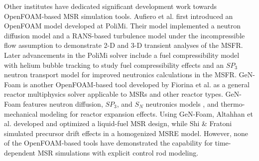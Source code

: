 Other institutes have dedicated significant development work towards
OpenFOAM-based \gls{MSR} simulation tools. Aufiero et al.
\cite{aufiero_development_2014} first introduced an OpenFOAM model developed
at \gls{PoliMi}. Their model implemented a neutron diffusion model and a
\gls{RANS}-based turbulence model under the incompressible flow assumption to demonstrate 2-D
and 3-D transient analyses of the \gls{MSFR}. Later advancements in the
\gls{PoliMi} solver include a fuel compressibility model with helium bubble
tracking to study fuel compressibility effects
\cite{cervi_development_2019} and an $SP_3$ neutron transport
model for improved neutronics calculations \cite{cervi_development_2019-1} in
the \gls{MSFR}. GeN-Foam is another OpenFOAM-based tool developed by Fiorina
et al. \cite{fiorina_gen-foam_2015} as a general reactor multiphysics solver
applicable to \glspl{MSR} and other reactor types. GeN-Foam features neutron
diffusion, $SP_3$, and $S_N$ neutronics models
\cite{fiorina_development_2016,fiorina_gen-foam_2015,fiorina_detailed_2019},
and thermo-mechanical modeling for reactor expansion effects. Using GeN-Foam,
Altahhan et al. \cite{altahhan_preliminary_2020} developed and optimized a
liquid-fuel \gls{MSR} design, while Shi \& Fratoni \cite{shi_gen-foam_2021}
simulated precursor drift effects in a homogenized \gls{MSRE} model. However, none of the
OpenFOAM-based tools have demonstrated the capability for time-dependent \gls{MSR} simulations
with explicit control rod modeling.

